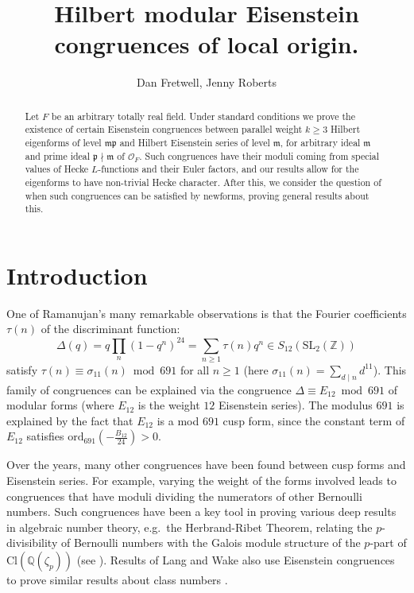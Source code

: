 \documentclass[a4paper,oneside]{amsart}
\date{}
\author{Dan Fretwell, Jenny Roberts}
\title{Hilbert modular Eisenstein congruences of local origin.}
\theoremstyle{plain}
\theoremstyle{definition}
\begin{document}
\begin{abstract}
Let $F$ be an arbitrary totally real field. Under standard conditions we prove the existence of certain Eisenstein congruences between parallel weight $k \geq 3$ Hilbert eigenforms of level $\mathfrak{mp}$ and Hilbert Eisenstein series of level $\mathfrak{m}$, for arbitrary ideal $\mathfrak{m}$ and prime ideal $\mathfrak{p}\nmid \mathfrak{m}$ of $\mathcal{O}_F$. Such congruences have their moduli coming from special values of Hecke $L$-functions and their Euler factors, and our results allow for the eigenforms to have non-trivial Hecke character. After this, we consider the question of when such congruences can be satisfied by newforms, proving general results about this.
\end{abstract}

\maketitle

\section{Introduction}

One of Ramanujan's many remarkable observations is that the Fourier coefficients $\tau(n)$ of the discriminant function: \[\Delta(q) = q\prod_n(1-q^n)^{24} = \sum_{n\geq 1}\tau(n)q^n \in S_{12}(\text{SL}_2(\mathbb{Z}))\] satisfy $\tau(n)\equiv \sigma_{11}(n) \bmod 691$ for all $n\geq 1$ (here $\sigma_{11}(n) = \sum_{d\mid n}d^{11}$). This family of congruences can be explained via the congruence $\Delta \equiv E_{12} \bmod 691$ of modular forms (where $E_{12}$ is the weight $12$ Eisenstein series). The modulus $691$ is explained by the fact that $E_{12}$ is a mod $691$ cusp form, since the constant term of $E_{12}$ satisfies $\text{ord}_{691}\left(-\frac{B_{12}}{24}\right) > 0$.

Over the years, many other congruences have been found between cusp forms and Eisenstein series. For example, varying the weight of the forms involved leads to congruences that have moduli dividing the numerators of other Bernoulli numbers. Such congruences have been a key tool in proving various deep results in algebraic number theory, e.g.\ the Herbrand-Ribet Theorem, relating the $p$-divisibility of Bernoulli numbers with the Galois module structure of the $p$-part of $\text{Cl}(\mathbb{Q}(\zeta_p))$ (see \cite{ribet}). Results of Lang and Wake also use Eisenstein congruences to prove similar results about class numbers \cite{langwake}.
\end{document}

